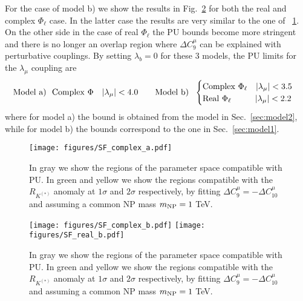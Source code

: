 \documentclass[a4paper,11pt]{article}
\newcommand{\be}{\begin{equation}}
\newcommand{\ee}{\end{equation}}
\begin{document}
For the case of model b) we show the results in Fig.~\ref{fig:LHmodel_b} for both the real and complex $\Phi_\ell$ case. In the latter case the results are very similar to the one of ~\ref{fig:LHmodel_a}. On the other side in the case of real $\Phi_\ell$
the PU bounds become more stringent and there is no longer an overlap region where $\Delta C_9^\mu$ can be explained with perturbative couplings. By setting $\lambda_b=0$ for these 3 models, the PU limits for the $\lambda_\mu$ coupling are
\be\label{eq:pheno_model1}
{\rm Model~a)}~~{\rm Complex}~\Phi\quad |\lambda_\mu|<4.0
\qquad
{\rm Model~b)}~~
\begin{cases}
{\rm Complex}~\Phi_\ell\quad |\lambda_\mu|<3.5 \\
{\rm Real}~\Phi_\ell\,~~\qquad |\lambda_\mu|<2.2 \\
 \end{cases}
\ee
where for model a) the bound is obtained from the model in Sec.~\ref{sec:model2}, while for model b) the bounds correspond to the one in Sec.~\ref{sec:model1}.

\begin{figure}[t!]
\begin{center}
\texttt{[image: figures/SF\_complex\_a.pdf]}  
\caption{\small In gray we show the regions of the parameter space compatible with PU. In green and yellow we show the regions compatible with the $R_{K^{(*)}}$ anomaly at $1\sigma$ and $2\sigma$ respectively, 
by fitting $\Delta C_9^\mu=-\Delta C_{10}^\mu$ and assuming a common NP mass 
$m_{\rm NP}=1$ TeV. }
\label{fig:LHmodel_a}
\end{center}
\end{figure}

\begin{figure}[t!]
\begin{center}
\texttt{[image: figures/SF\_complex\_b.pdf]}  \hfill
\texttt{[image: figures/SF\_real\_b.pdf]} 
\caption{\small In gray we show the regions of the parameter space compatible with PU. In green and yellow we show the regions compatible with the $R_{K^{(*)}}$ anomaly at $1\sigma$ and $2\sigma$ respectively, 
by fitting $\Delta C_9^\mu=-\Delta C_{10}^\mu$ and assuming a common NP mass 
$m_{\rm NP}=1$ TeV.  }
\label{fig:LHmodel_b}
\end{center}
\end{figure}
\end{document}
